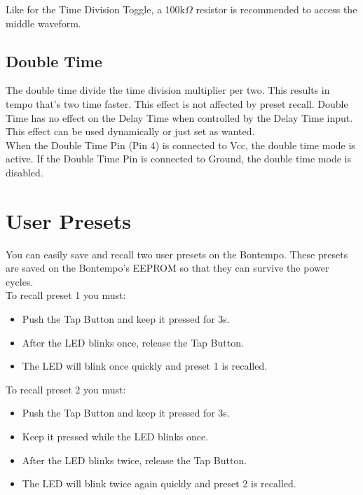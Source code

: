 \documentclass[a4paper, 10pt]{article}
\begin{document}
Like for the Time Division Toggle, a 100k$\Omega$ resistor is recommended to access the middle waveform.\\

\subsection{Double Time}
\label{sec:doubletime}
\bigbreak
The double time divide the time division multiplier per two. This results in tempo that's two time faster. This effect is not affected by preset recall. Double Time has no effect on the Delay Time when controlled by the Delay Time input.
This effect can be used dynamically or just set as wanted.\\

When the Double Time Pin (Pin 4) is connected to Vcc, the double time mode is active. If the Double Time Pin is connected to Ground, the double time mode is disabled.\\ 
\newpage
\section{User Presets}
\label{sec:userpresets}
\bigbreak
You can easily save and recall two user presets on the Bontempo. These presets are saved on the Bontempo's EEPROM so that they can survive the power cycles.\\

To recall preset 1 you must:\\
\begin{itemize}
\item Push the Tap Button and keep it pressed for 3s.
\item After the LED blinks once, release the Tap Button.
\item The LED will blink once quickly and preset 1 is recalled.\\
\end{itemize}

To recall preset 2 you must:\\
\begin{itemize}
\item Push the Tap Button and keep it pressed for 3s.
\item Keep it pressed while the LED blinks once.
\item After the LED blinks twice, release the Tap Button.
\item The LED will blink twice again quickly and preset 2 is recalled.\\
\end{itemize}
\end{document}
